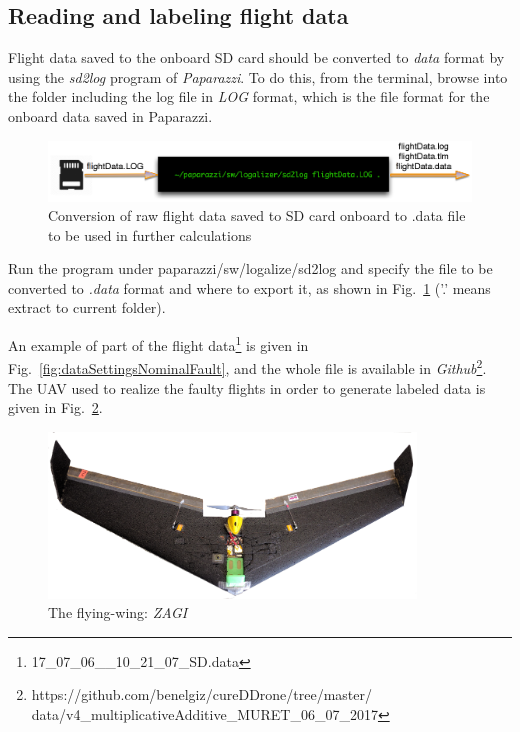 \subsection{Reading and labeling flight data}


Flight data saved to the onboard SD card should be converted to \emph{data} format by using the \textit{sd2log} program of \emph{Paparazzi}. To do this, from the terminal, browse into the folder including the log file in \emph{LOG} format, which is the file format for the onboard data saved in Paparazzi. 

\begin{figure}[h]
\begin{center}
\includegraphics[width=15cm]{figures/dataManip}    %
\caption{Conversion of raw flight data saved to SD card onboard to .data file to be used in further calculations} 
\label{fig:dataManip}
\end{center}
\end{figure}

Run the program under paparazzi/sw/logalize/sd2log and specify the file to be converted to \emph{.data} format and where to export it, as shown in Fig.~\ref{fig:dataManip} ('.' means extract to current folder). 

An example of part of the flight data\footnote{17\_07\_06\_\_10\_21\_07\_SD.data} is given in Fig.~\ref{fig:dataSettingsNominalFault}, and the whole file is available in \emph{Github}\footnote{https://github.com/benelgiz/cureDDrone/tree/master/ \\ data/v4\_multiplicativeAdditive\_MURET\_06\_07\_2017}. 
The UAV used to realize the faulty flights in order to generate labeled data is given in Fig.~\ref{fig:zagi}. 

\begin{figure}[h]
\begin{center}
\includegraphics[width=0.87\textwidth]{figures/zagi}    %
\caption{The flying-wing: \emph{ZAGI}} 
\label{fig:zagi}
\end{center}
\end{figure}

